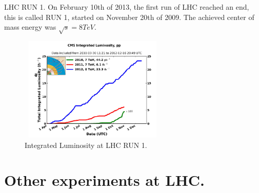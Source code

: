 \documentclass[8pt]{beamer}
\begin{document}

\begin{frame}[fragile]{LHC RUN 1.}
	On February 10th of 2013, the first run of LHC reached an end, this is called RUN 1, started on November 20th of 2009. The achieved center of mass energy was $\sqrt{s}=8TeV$.\\
	\begin{figure}
		\centering
		\includegraphics[height=5cm,width=7cm]{5}
		\caption{Integrated Luminosity at LHC RUN 1.}
	\end{figure}	
\end{frame}



\section{Other experiments at LHC.}

\end{document}
